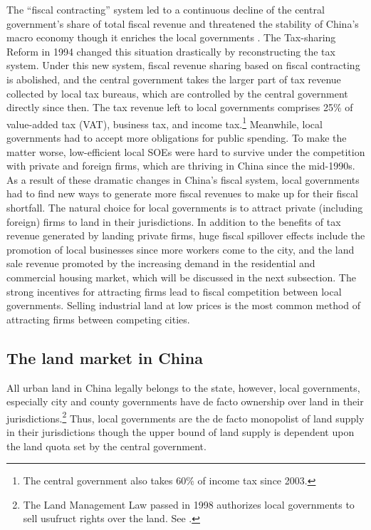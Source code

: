 The ``fiscal contracting'' system led to a continuous decline of the central government's share
of total fiscal revenue and threatened the stability of China's macro economy though it
enriches the local governments \citep{LiuXiong+2020+183+207}. The Tax-sharing Reform in
1994 changed this situation drastically by reconstructing the tax system.
Under this new system, fiscal revenue sharing based on fiscal contracting is abolished,
and the central government takes the larger part of tax revenue collected by local tax bureaus,
which are controlled by the central government directly since then.
The tax revenue left to local governments comprises
25\% of value-added tax (VAT), business tax, and income tax.\footnote{The central government
    also takes 60\% of income tax since 2003.}
Meanwhile, local governments had to accept more obligations for public spending.
To make the matter worse, low-efficient local SOEs were hard to survive under the competition
with private and foreign firms, which are thriving in China since the mid-1990s.
As a result of these dramatic changes in China's fiscal system, local governments
had to find new ways to generate more fiscal revenues to make up for their fiscal shortfall.
The natural choice for local governments is to attract private (including foreign) firms
to land in their jurisdictions.
In addition to the benefits of tax revenue generated by
landing private firms, huge fiscal spillover effects
include the promotion of local businesses since more workers come to the city, and
the land sale revenue promoted by the increasing demand in the residential and commercial housing
market, which will be discussed in the next subsection.
The strong incentives for attracting
firms lead to fiscal competition between local governments.
Selling industrial land at low prices is
the most common method of attracting firms between competing cities.

\subsection{The land market in China}
All urban land in China legally belongs to the state, however, local governments,
especially city and county governments have de facto ownership over land in their
jurisdictions.\footnote{The Land Management Law passed in 1998 authorizes local governments
    to sell usufruct rights over the land. See \cite{LiuXiong+2020+183+207}.}
Thus, local governments are the de facto monopolist of land supply in their jurisdictions
though the upper bound of land supply is dependent upon the land quota set by
the central government.


